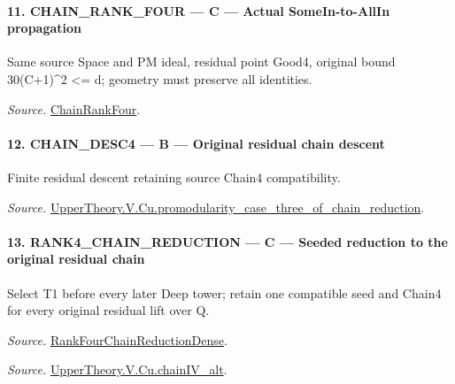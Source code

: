\documentclass[11pt,a4paper]{article}
\numberwithin{equation}{section}
\theoremstyle{remark}\newtheorem{remark}[theorem]{Remark}
\begin{document}
\paragraph{11. CHAIN\_\allowbreak RANK\_\allowbreak FOUR — C — Actual SomeIn-to-AllIn propagation}

Same source Space and PM ideal, residual point Good4, original bound 30(C+1)\textasciicircum{}2 <= d; geometry must preserve all identities.

\emph{Source.} \href{https://github.com/CocoSgt/riemann-hypothesis-lean/blob/7cbf7a0c32fca1badf05931879a37c3f8a2b03b4/src/Development/AutomorphicArithmetic/AutomorphicVarieties/ModularityArgument/ThresholdArguments/DenseThresholdCases/PromodularityCaseThree.lean#L26-L32}{ChainRankFour}.



\paragraph{12. CHAIN\_\allowbreak DESC4 — B — Original residual chain descent}

Finite residual descent retaining source Chain4 compatibility.

\emph{Source.} \href{https://github.com/CocoSgt/riemann-hypothesis-lean/blob/7cbf7a0c32fca1badf05931879a37c3f8a2b03b4/src/Development/AutomorphicArithmetic/AutomorphicVarieties/ModularityArgument/ThresholdArguments/DenseThresholdCases/PromodularityCaseThreeOfLemmas.lean#L131-L153}{UpperTheory.V.Cu.promodularity\_\allowbreak case\_\allowbreak three\_\allowbreak of\_\allowbreak chain\_\allowbreak reduction}.



\paragraph{13. RANK4\_\allowbreak CHAIN\_\allowbreak REDUCTION — C — Seeded reduction to the original residual chain}

Select T1 before every later Deep tower; retain one compatible seed and Chain4 for every original residual lift over Q.

\emph{Source.} \href{https://github.com/CocoSgt/riemann-hypothesis-lean/blob/7cbf7a0c32fca1badf05931879a37c3f8a2b03b4/src/Development/AutomorphicArithmetic/AutomorphicVarieties/ModularityArgument/ThresholdArguments/DenseThresholdCases/PromodularityCaseThree.lean#L33-L39}{RankFourChainReductionDense}.

\emph{Source.} \href{https://github.com/CocoSgt/riemann-hypothesis-lean/blob/7cbf7a0c32fca1badf05931879a37c3f8a2b03b4/src/Development/AutomorphicArithmetic/AutomorphicVarieties/ModularityArgument/ThresholdArguments/DenseThresholdCases/CuPChainIV.lean#L16-L82}{UpperTheory.V.Cu.chainIV\_\allowbreak alt}.
\end{document}
